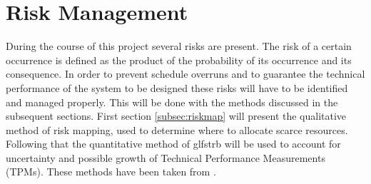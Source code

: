 \section{Risk Management}\label{cha:plan}
During the course of this project several risks are present. The risk of a certain occurrence is defined as the product of the probability of its occurrence and its consequence. In order to prevent schedule overruns and to guarantee the technical performance of the system to be designed these risks will have to be identified and managed properly. This will be done with the methods discussed in the subsequent sections. First section \ref{subsec:riskmap} will present the qualitative method of risk mapping, used to determine where to allocate scarce resources. Following that the quantitative method of glfs{trb} will be used to account for uncertainty and possible growth of Technical Performance Measurements (TPMs). These methods have been taken from \cite{nasasehandbook}.

